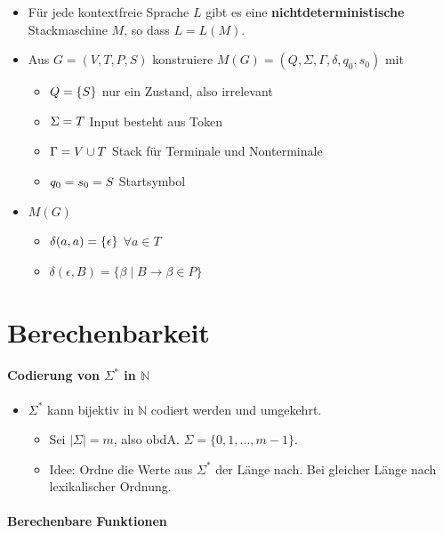 \documentclass{scrartcl}
\begin{document}
\begin{itemize}
	\item Für jede kontextfreie Sprache $L$ gibt es eine \textbf{nichtdeterministische} Stackmaschine $M$, so dass $L = L(M)$.
	\item Aus $G = (V,T,P,S)$ konstruiere $M(G) = (Q,\Sigma,\Gamma,\delta,q_0,s_0)$ mit
	\begin{itemize}
		\item $Q = \{ S \} \hfill$ nur ein Zustand, also irrelevant
		\item $\Sigma = T \hfill$ Input besteht aus Token
		\item $\Gamma = V \cup T \hfill$ Stack für Terminale und Nonterminale
		\item $q_0 = s_0 = S \hfill$ Startsymbol
	\end{itemize}
	\item $M(G)$
	\begin{itemize}
		\item $\delta(a,a) = \{ \epsilon \} \hfill$ $\forall a \in T$
		\item $\delta(\epsilon,B) = \{ \beta \mid B \rightarrow \beta \in P \}$
	\end{itemize}
\end{itemize}

\pagebreak
\section{Berechenbarkeit}

\paragraph{Codierung von $\Sigma^*$ in $\mathbb{N}$}

\begin{itemize}
	\item $\Sigma^*$ kann bijektiv in $\mathbb{N}$ codiert werden und umgekehrt.
	\begin{itemize}
		\item Sei $|\Sigma| = m$, also obdA. $\Sigma = \{ 0,1,\ldots,m-1 \}$.
		\item Idee: Ordne die Werte aus $\Sigma^*$ der Länge nach. Bei gleicher Länge nach lexikalischer Ordnung.
	\end{itemize}
\end{itemize}

\paragraph{Berechenbare Funktionen}
\end{document}
